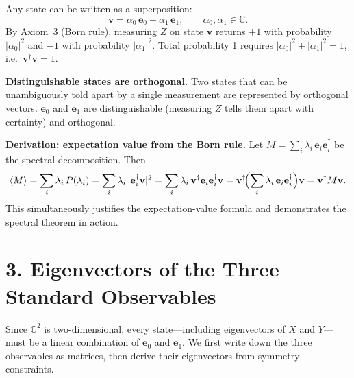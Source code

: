 \documentclass[12pt,a4paper]{article}
\begin{document}
Any state can be written as a superposition:
\[
    \mathbf{v} = \alpha_0\,\mathbf{e}_0 + \alpha_1\,\mathbf{e}_1, \qquad
    \alpha_0,\alpha_1\in\mathbb{C}.
\]
By Axiom~3 (Born rule), measuring $Z$ on state $\mathbf{v}$ returns $+1$ with probability $|\alpha_0|^2$ and $-1$ with probability $|\alpha_1|^2$.  Total probability 1 requires $|\alpha_0|^2 + |\alpha_1|^2 = 1$, i.e.\ $\mathbf{v}^\dagger\mathbf{v}=1$.

\medskip
\noindent\textbf{Distinguishable states are orthogonal.}  Two states that can be unambiguously told apart by a single measurement are represented by orthogonal vectors.  $\mathbf{e}_0$ and $\mathbf{e}_1$ are distinguishable (measuring $Z$ tells them apart with certainty) and orthogonal.

\medskip
\noindent\textbf{Derivation: expectation value from the Born rule.}  Let $M = \sum_i \lambda_i\,\mathbf{e}_i\mathbf{e}_i^\dagger$ be the spectral decomposition.  Then
\[
    \langle M\rangle
    = \sum_i \lambda_i\,P(\lambda_i)
    = \sum_i \lambda_i\,|\mathbf{e}_i^\dagger\mathbf{v}|^2
    = \sum_i \lambda_i\,\mathbf{v}^\dagger\mathbf{e}_i\mathbf{e}_i^\dagger\mathbf{v}
    = \mathbf{v}^\dagger\!\Bigl(\sum_i \lambda_i\,\mathbf{e}_i\mathbf{e}_i^\dagger\Bigr)\mathbf{v}
    = \mathbf{v}^\dagger M\mathbf{v}.
\]
This simultaneously justifies the expectation-value formula and demonstrates the spectral theorem in action.

\medskip
\noindent{}

\section{3. Eigenvectors of the Three Standard Observables}

Since $\mathbb{C}^2$ is two-dimensional, every state---including eigenvectors of $X$ and $Y$---must be a linear combination of $\mathbf{e}_0$ and $\mathbf{e}_1$.  We first write down the three observables as matrices, then derive their eigenvectors from symmetry constraints.
\end{document}
